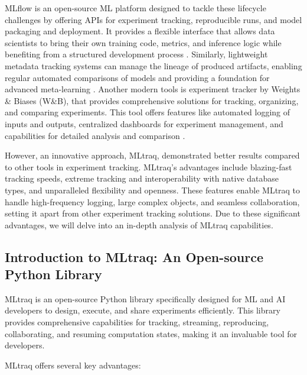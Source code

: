 MLflow is an open-source ML platform designed to tackle these lifecycle challenges by offering APIs for experiment tracking, reproducible runs, and model packaging and deployment. It provides a flexible interface that allows data scientists to bring their own training code, metrics, and inference logic while benefiting from a structured development process \cite{zaharia2018accelerating}. Similarly, lightweight metadata tracking systems can manage the lineage of produced artifacts, enabling regular automated comparisons of models and providing a foundation for advanced meta-learning \cite{schelter2017automatically}. Another modern tools is experiment tracker by Weights \& Biases (W\&B), that provides comprehensive solutions for tracking, organizing, and comparing experiments. This tool offers features like automated logging of inputs and outputs, centralized dashboards for experiment management, and capabilities for detailed analysis and comparison \cite{wandb2023}.

However, an innovative approach, MLtraq, demonstrated better results compared to other tools in experiment tracking. MLtraq's advantages include blazing-fast tracking speeds, extreme tracking and interoperability with native database types, and unparalleled flexibility and openness. These features enable MLtraq to handle high-frequency logging, large complex objects, and seamless collaboration, setting it apart from other experiment tracking solutions. Due to these significant advantages, we will delve into an in-depth analysis of MLtraq capabilities.

\subsection{Introduction to MLtraq: An Open-source Python Library}

MLtraq is an open-source Python library specifically designed for ML and AI developers to design, execute, and share experiments efficiently. This library provides comprehensive capabilities for tracking, streaming, reproducing, collaborating, and resuming computation states, making it an invaluable tool for developers. \cite{mltraq2024}

MLtraq offers several key advantages:

